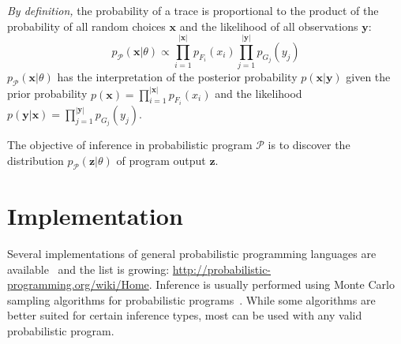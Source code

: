 \documentclass[a4paper,oneside]{article}
\begin{document}
\emph{By definition,} the probability of a trace is proportional
to the product of the probability of all random choices
$\pmb{x}$ and the likelihood of all observations $\pmb{y}$:
\begin{equation}
	p_{\mathcal{P}}(\pmb{x}|\theta) \propto \prod_{i=1}^{\left|\pmb{x}\right|}
	p_{F_i}(x_i) \prod_{j=1}^{\left|\pmb{y}\right|}p_{G_j}(y_{j})
  \label{eqn:p-trace}
\end{equation}
$p_{\mathcal{P}}(\pmb{x}|\theta)$ has the interpretation of the
posterior probability $p(\pmb{x}|\pmb{y})$ given the prior
probability $p(\pmb{x}) = \prod_{i=1}^{\left|\pmb{x}\right|}
p_{F_i}(x_i)$ and the likelihood $p(\pmb{y}|\pmb{x}) =
\prod_{j=1}^{\left|\pmb{y}\right|} p_{G_j}(y_{j})$.

The objective of inference in probabilistic program
$\mathcal{P}$ is to discover the distribution
$p_{\mathcal{P}}(\pmb{z}|\theta)$ of program output $\pmb{z}$.

\section*{Implementation}

Several implementations of general probabilistic programming
languages are available~\cite{GMR+08,MSP14,WVM14} and the list
is growing: \url{http://probabilistic-programming.org/wiki/Home}.
Inference is usually performed using Monte Carlo sampling
algorithms for probabilistic programs~\cite{WSG11,WVM14,PWD+14}.
While some algorithms are better suited for certain inference
types, most can be used with any valid probabilistic program.



\end{document}
